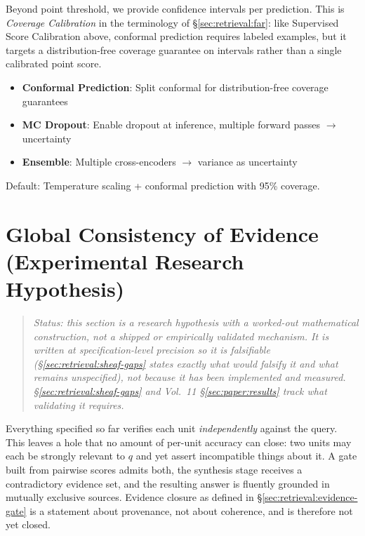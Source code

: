 Beyond point threshold, we provide confidence intervals per prediction. This is \emph{Coverage Calibration} in the terminology of \S\ref{sec:retrieval:far}: like Supervised Score Calibration above, conformal prediction requires labeled examples, but it targets a distribution-free coverage guarantee on intervals rather than a single calibrated point score.
\begin{itemize}
  \item \textbf{Conformal Prediction}: Split conformal for distribution-free coverage guarantees
  \item \textbf{MC Dropout}: Enable dropout at inference, multiple forward passes $\to$ uncertainty
  \item \textbf{Ensemble}: Multiple cross-encoders $\to$ variance as uncertainty
\end{itemize}

Default: Temperature scaling + conformal prediction with 95\% coverage.

\section{Global Consistency of Evidence (Experimental Research Hypothesis)}
\label{sec:retrieval:sheaf}

\begin{quote}
\textit{Status: this section is a research hypothesis with a worked-out mathematical construction, not a shipped or empirically validated mechanism. It is written at specification-level precision so it is falsifiable (\S\ref{sec:retrieval:sheaf-gaps} states exactly what would falsify it and what remains unspecified), not because it has been implemented and measured. \S\ref{sec:retrieval:sheaf-gaps} and Vol.~11 \S\ref{sec:paper:results} track what validating it requires.}
\end{quote}

Everything specified so far verifies each unit \emph{independently} against the query. This leaves a hole that no amount of per-unit accuracy can close: two units may each be strongly relevant to $q$ and yet assert incompatible things about it. A gate built from pairwise scores admits both, the synthesis stage receives a contradictory evidence set, and the resulting answer is fluently grounded in mutually exclusive sources. Evidence closure as defined in \S\ref{sec:retrieval:evidence-gate} is a statement about provenance, not about coherence, and is therefore not yet closed.

